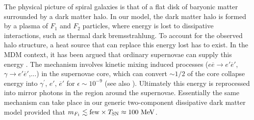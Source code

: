 \documentclass[12pt]{article}
\begin{document}
{{The physical picture of spiral galaxies is that of a flat disk of
baryonic matter surrounded by a dark matter halo. In our model, the dark
matter halo is formed by a plasma of $F _1$ and $F _2$ particles, where
energy is lost to dissipative interactions, such as thermal dark
bremsstrahlung. To account for the observed halo structure, a heat
source that can replace this energy lost has to exist. In the MDM
context, it has been argued that ordinary supernovae can supply this
energy \cite{spheroidal,depth4,review}. The mechanism involves kinetic
mixing induced processes ($e\overline{e} \rightarrow e'\overline{e}'$,
$\gamma \rightarrow e'\overline{e}'$,...) in the supernovae core, which
can convert $\sim 1/2$ of the core collapse energy into $\gamma ^{'}$,
$e'$, $\overline{e}'$ for $\epsilon \sim 10 ^{-9}$ \cite{raf,updated}
(see also \cite{silagadze}). Ultimately this energy is reprocessed into
mirror photons in the region around the supernovae. Essentially the same
mechanism can take place in our generic two-component dissipative dark
matter model provided that $m _{F_1} \lesssim {\rm few} \times T
_{\text{SN}} \approx 100 \ {\rm MeV}$.


}}
\end{document}

